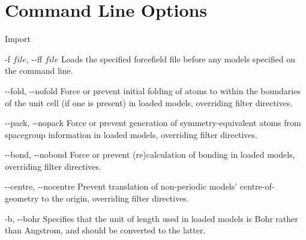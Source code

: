 \chapter{Command Line Options}
\label{sec:cli}


\begin{optlist}{Import}

	\item[-f $file$, {-}{-}ff $file$]
		Loads the specified forcefield file before any models specified on the command line.

	\item[{-}{-}fold, {-}{-}nofold\its]
		Force or prevent initial folding of atoms to within the boundaries of the unit cell (if one is present) in loaded models, overriding filter directives.
	
	\item[{-}{-}pack, {-}{-}nopack\its]
		Force or prevent generation of symmetry-equivalent atoms from spacegroup information in loaded models, overriding filter directives.
	
	\item[{-}{-}bond, {-}{-}nobond\its]
		Force or prevent (re)calculation of bonding in loaded models, overriding filter directives.
	
	\item[{-}{-}centre, {-}{-}nocentre\its]
		Prevent translation of non-periodic models’ centre-of-geometry to the origin, overriding filter directives.
	
	\item[-b, {-}{-}bohr\its]
		Specifies that the unit of length used in loaded models is Bohr rather than Angstrom, and should be converted to the latter.

\end{optlist}


